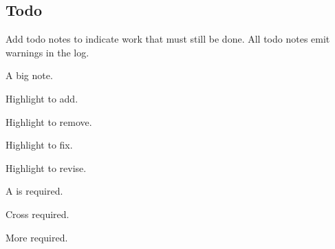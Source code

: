 \documentclass[10pt,titlepage]{article}
\begin{document}
\subsection{Todo}

\makeatletter
\let\old@stz@warning\@stz@warning
\let\@stz@warning\@gobble
\makeatother

Add todo notes to indicate work that must still be done.
All todo notes emit warnings in the log.

\begin{example}
\begin{todo}
  A big note.
\end{todo}
\end{example}

\begin{example}
Highlight  to add.
\todoadd{}
\end{example}

\begin{example}
Highlight  to remove.
\todoremove{}
\end{example}

\begin{example}
Highlight  to fix.
\todofix{}
\end{example}

\begin{example}
Highlight  to revise.
\todorevise{}
\end{example}

\begin{example}
A  is required.
\todocite{}
\end{example}

\begin{example}
Cross  required.
\todoref{}
\end{example}

\begin{example}
More  required.
\todomore{}
\end{example}

\begin{example}
\todosentence
\end{example}

\begin{example}
\todopar
\end{example}
\end{document}
